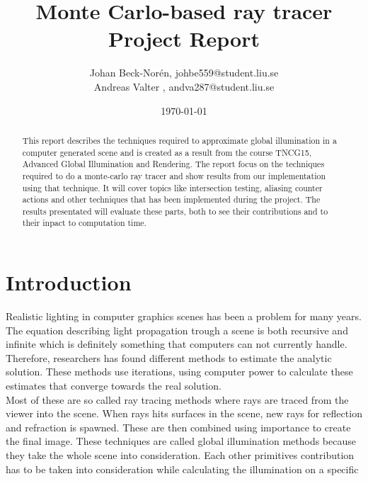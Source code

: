 \documentclass[a4paper, 12pt]{report}
\begin{document}
\title{Monte Carlo-based ray tracer\\ Project Report}   %
\author{
	Johan Beck-Nor\'{e}n, johbe559@student.liu.se
	\\Andreas Valter , andva287@student.liu.se
	}
\date{\today}    %
\maketitle

\setcounter{page}{2}
\begin{abstract}
This report describes the techniques required to approximate global illumination in a computer generated scene and is created as a result from the course TNCG15, Advanced Global Illumination and Rendering.
The report focus on the techniques required to do a monte-carlo ray tracer and show results from our implementation using that technique.
It will cover topics like intersection testing, aliasing counter actions and other techniques that has been implemented during the project.
The results presentated will evaluate these parts, both to see their contributions and to their inpact to computation time.

\end{abstract}

\tableofcontents


\chapter{Introduction} \label{ch:introduction}
Realistic lighting in computer graphics scenes has been a problem for many years. 
The equation describing light propagation trough a scene is both recursive and infinite which is definitely something that computers can not currently handle.
Therefore, researchers has found different methods to estimate the analytic solution.
These methods use iterations, using computer power to calculate these estimates that converge towards the real solution.\\

Most of these are so called ray tracing methods where rays are traced from the viewer into the scene.
When rays hits surfaces in the scene, new rays for reflection and refraction is spawned.
These are then combined using importance to create the final image.
These techniques are called global illumination methods because they take the whole scene into consideration.
Each other primitives contribution has to be taken into consideration while calculating the illumination on a specific 
\end{document}
